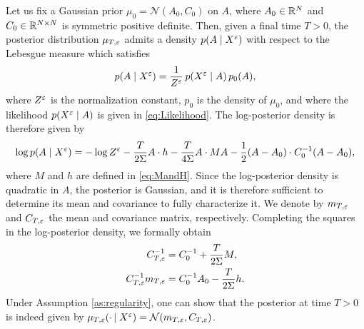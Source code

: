 \documentclass[10pt]{article}
\begin{document}
Let us fix a Gaussian prior $\mu_0 = \mathcal N(A_0, C_0)$ on $A$, where $A_0 \in \mathbb{R}^N$ and $C_0 \in \mathbb{R}^{N\times N}$ is symmetric positive definite. Then, given a final time $T > 0$, the posterior distribution $\mu_{T,\varepsilon}$ admits a density $p(A \mid X^\varepsilon)$ with respect to the Lebesgue measure which satisfies
\begin{equation}
p(A \mid X^\varepsilon) = \frac1{Z^\varepsilon} \, p(X^\varepsilon \mid A) \, p_0(A),
\end{equation}
where $Z^\varepsilon$ is the normalization constant, $p_0$ is the density of $\mu_0$, and where the likelihood $p(X^\varepsilon \mid A)$ is given in \eqref{eq:Likelihood}. The log-posterior density is therefore given by
\begin{equation}\label{eq:Posterior}
\log p(A \mid X^\varepsilon) = -\log Z^\varepsilon - \frac{T}{2\Sigma} A \cdot h - \frac{T}{4\Sigma} A \cdot M A - \frac12 (A - A_0) \cdot C_0^{-1}(A-A_0),
\end{equation}
where $M$ and $h$ are defined in \eqref{eq:MandH}.
Since the log-posterior density is quadratic in $A$, the posterior is Gaussian, and it is therefore sufficient to determine its mean and covariance to fully characterize it. We denote by $m_{T,\varepsilon}$ and $C_{T,\varepsilon}$ the mean and covariance matrix, respectively. Completing the squares in the log-posterior density, we formally obtain
\begin{equation}
\begin{aligned}
C_{T,\varepsilon}^{-1} &= C_0^{-1} + \frac{T}{2\Sigma} M, \\
C_{T,\varepsilon}^{-1}m_{T,\varepsilon} &= C_0^{-1}A_0 - \frac{T}{2\Sigma} h. 
\end{aligned}
\end{equation}
Under Assumption \ref{as:regularity}, one can show that the posterior at time $T > 0$ is indeed given by $\mu_{T,\varepsilon}(\cdotp\mid X^\varepsilon) = \mathcal N(m_{T,\varepsilon}, C_{T,\varepsilon})$. 
\end{document}
